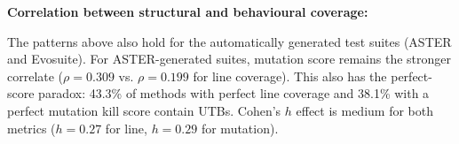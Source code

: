 \smallskip
\noindent\textbf{Correlation between structural and behavioural coverage:}






The patterns above also hold for the automatically generated test suites (ASTER and Evosuite). 
For ASTER-generated suites, mutation score remains the stronger correlate ($\rho=0.309$ vs. $\rho=0.199$ for line coverage). This also has the perfect-score paradox: 43.3\% of methods with perfect line coverage and 38.1\% with a perfect mutation kill score contain UTBs. 
Cohen's $h$ effect is medium for both metrics ($h=0.27$ for line, $h=0.29$ for mutation). 

